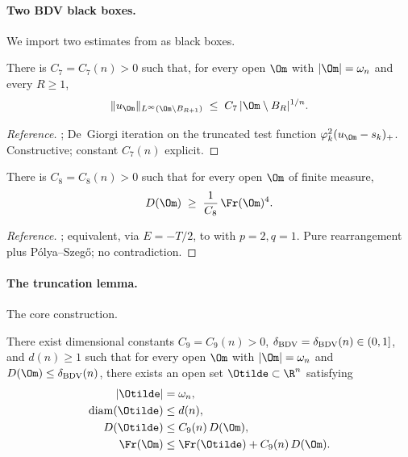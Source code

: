 \paragraph{Two BDV black boxes.} We import two estimates from
\cite{BDV} as black boxes.

\begin{lemma}
\label{lem:51}
There is $C_7=C_7(n)>0$ such that, for every open $\Om$ with
$|\Om|=\omega_n$ and every $R\ge 1$,
\begin{equation}\label{eq:tail}
\|u_\Om\|_{L^\infty(\Om\setminus B_{R+1})}
\;\le\; C_7\,|\Om\setminus B_R|^{1/n}.
\end{equation}
\end{lemma}

\begin{proof}[Reference]
\cite[Lemma~5.1]{BDV}; De~Giorgi iteration on the truncated test
function $\varphi_k^2(u_\Om-s_k)_+$. Constructive; constant $C_7(n)$
explicit.
\end{proof}

\begin{lemma}\label{lem:52}
There is $C_8=C_8(n)>0$ such that for every open $\Om$ of finite
measure,
\begin{equation}\label{eq:far}
D(\Om) \;\ge\; \frac{1}{C_8}\,\Fr(\Om)^4.
\end{equation}
\end{lemma}

\begin{proof}[Reference]
\cite[Lemma~5.2]{BDV}; equivalent, via $E=-T/2$, to
\cite[Theorem~1]{FMPLaplace} with $p=2,q=1$. Pure rearrangement plus
P\'olya--Szeg\H{o}; no contradiction.
\end{proof}

\paragraph{The truncation lemma.} The core construction.

\begin{lemma}
\label{lem:53}
There exist dimensional constants $C_9=C_9(n)>0$,
$\delta_{\rm BDV}=\delta_{\rm BDV}(n)\in(0,1]$, and
$d(n)\ge 1$ such that for every open $\Om$ with $|\Om|=\omega_n$ and
$D(\Om)\le\delta_{\rm BDV}(n)$, there exists an open set
$\Otilde\subset\R^n$ satisfying
\begin{align}
|\Otilde| &= \omega_n, \label{eq:53vol} \\
\mathrm{diam}(\Otilde) &\le d(n), \label{eq:53diam} \\
D(\Otilde) &\le C_9(n)\,D(\Om), \label{eq:53D} \\
\Fr(\Om) &\le \Fr(\Otilde) + C_9(n)\,D(\Om). \label{eq:53A}
\end{align}
\end{lemma}

